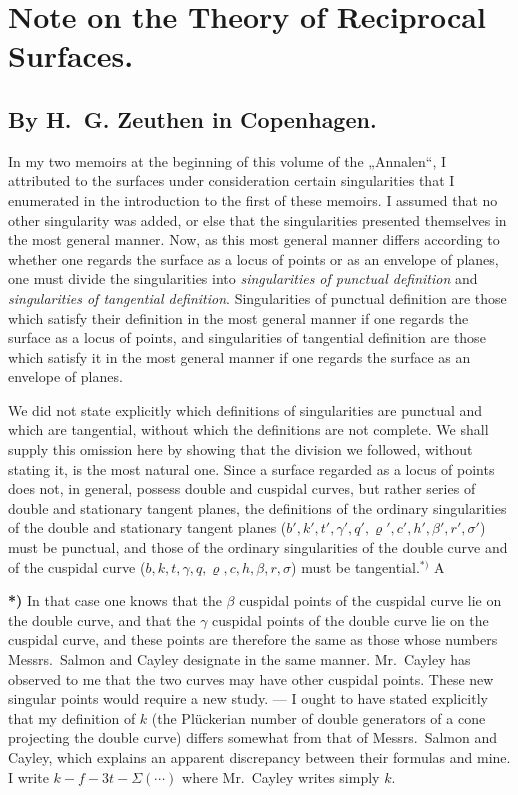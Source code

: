 \documentclass{article}
\begin{document}
\section*{Note on the Theory of Reciprocal Surfaces.}

\subsection*{By H.~G. Zeuthen in Copenhagen.}

In my two memoirs at the beginning of this volume of the „Annalen“, I attributed to the surfaces under consideration certain singularities that I enumerated in the introduction to the first of these memoirs. I assumed that no other singularity was added, or else that the singularities presented themselves in the most general manner. Now, as this most general manner differs according to whether one regards the surface as a locus of points or as an envelope of planes, one must divide the singularities into \emph{singularities of punctual definition} and \emph{singularities of tangential definition}. Singularities of punctual definition are those which satisfy their definition in the most general manner if one regards the surface as a locus of points, and singularities of tangential definition are those which satisfy it in the most general manner if one regards the surface as an envelope of planes.

We did not state explicitly which definitions of singularities are punctual and which are tangential, without which the definitions are not complete. We shall supply this omission here by showing that the division we followed, without stating it, is the most natural one. Since a surface regarded as a locus of points does not, in general, possess double and cuspidal curves, but rather series of double and stationary tangent planes, the definitions of the ordinary singularities of the double and stationary tangent planes ($b', k', t', \gamma', q', \varrho', c', h', \beta', r', \sigma'$) must be punctual, and those of the ordinary singularities of the double curve and of the cuspidal curve ($b, k, t, \gamma, q, \varrho, c, h, \beta, r, \sigma$) must be tangential.${}^{*)}$ A

\textbf{*)} In that case one knows that the $\beta$ cuspidal points of the cuspidal curve lie on the double curve, and that the $\gamma$ cuspidal points of the double curve lie on the cuspidal curve, and these points are therefore the same as those whose numbers Messrs.~Salmon and Cayley designate in the same manner. Mr.~Cayley has observed to me that the two curves may have other cuspidal points. These new singular points would require a new study. --- I ought to have stated explicitly that my definition of $k$ (the Plückerian number of double generators of a cone projecting the double curve) differs somewhat from that of Messrs.~Salmon and Cayley, which explains an apparent discrepancy between their formulas and mine. I write $k - f - 3t - \Sigma(\cdots)$ where Mr.~Cayley writes simply $k$.
\end{document}
